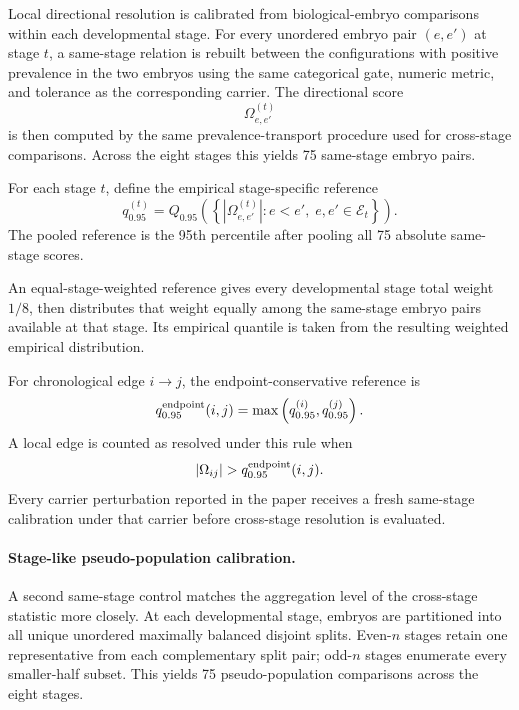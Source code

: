 \documentclass[11pt]{article}
\begin{document}
Local directional resolution is calibrated from biological-embryo comparisons within each developmental stage. For every unordered embryo pair \((e,e')\) at stage \(t\), a same-stage relation is rebuilt between the configurations with positive prevalence in the two embryos using the same categorical gate, numeric metric, and tolerance as the corresponding carrier. The directional score
\[
\Omega_{e,e'}^{(t)}
\]
is then computed by the same prevalence-transport procedure used for cross-stage comparisons. Across the eight stages this yields 75 same-stage embryo pairs.

For each stage \(t\), define the empirical stage-specific reference
\begin{equation}
q_{0.95}^{(t)}
=
Q_{0.95}
\left(
\left\{
\left|\Omega_{e,e'}^{(t)}\right|
:
e<e',\;
e,e'\in\mathcal E_t
\right\}
\right).
\label{eq:stageq95}
\end{equation}
The pooled reference is the 95th percentile after pooling all 75 absolute same-stage scores.

An equal-stage-weighted reference gives every developmental stage total weight \(1/8\), then distributes that weight equally among the same-stage embryo pairs available at that stage. Its empirical quantile is taken from the resulting weighted empirical distribution.

For chronological edge \(i\rightarrow j\), the endpoint-conservative reference is
\begin{equation}
q_{0.95}^{\rm endpoint}(i,j)
=
\max
\left(
q_{0.95}^{(i)},
q_{0.95}^{(j)}
\right).
\label{eq:endpointq95}
\end{equation}
A local edge is counted as resolved under this rule when
\[
|\Omega_{ij}|
>
q_{0.95}^{\rm endpoint}(i,j).
\]
Every carrier perturbation reported in the paper receives a fresh same-stage calibration under that carrier before cross-stage resolution is evaluated.

\paragraph{Stage-like pseudo-population calibration.}
A second same-stage control matches the aggregation level of the cross-stage statistic more closely. At each developmental stage, embryos are partitioned into all unique unordered maximally balanced disjoint splits. Even-\(n\) stages retain one representative from each complementary split pair; odd-\(n\) stages enumerate every smaller-half subset. This yields 75 pseudo-population comparisons across the eight stages.
\end{document}
